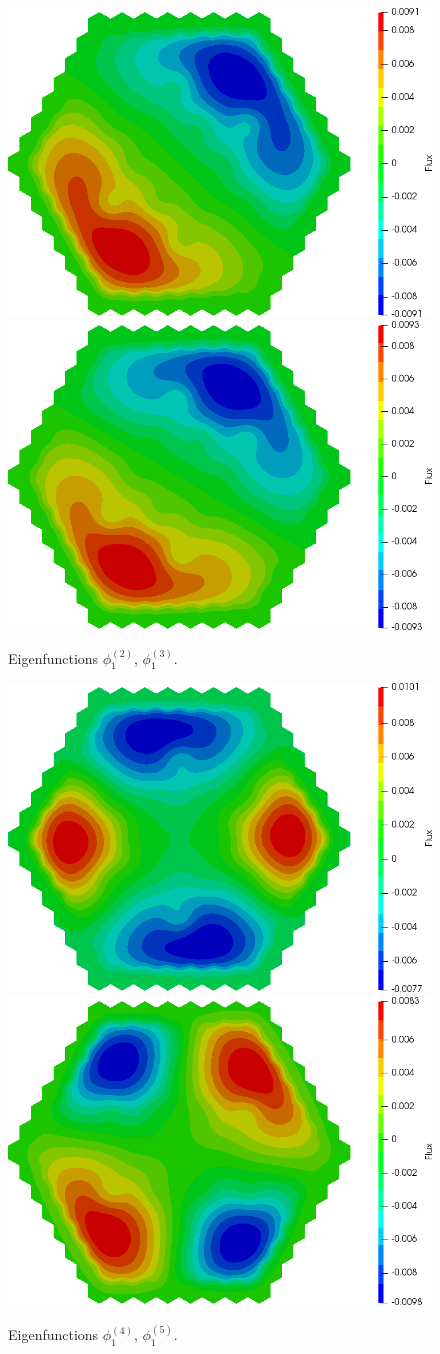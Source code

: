 \documentclass[authoryear]{elsarticle}
\begin{document}
\begin{figure}[H]
\begin{center}
	\includegraphics[width=0.49\linewidth]{iaea_with/alpha_delayed_sp3_u1_2.png}
	\includegraphics[width=0.49\linewidth]{iaea_with/alpha_delayed_sp3_u1_3.png}\\
	\caption{Eigenfunctions $\phi_1^{(2)}$, $\phi_1^{(3)}$.}
	\label{fig:iaea_with_fun_del_2}
\end{center}
\end{figure}
\begin{figure}[H]
\begin{center}
	\includegraphics[width=0.49\linewidth]{iaea_with/alpha_delayed_sp3_u1_4.png}
	\includegraphics[width=0.49\linewidth]{iaea_with/alpha_delayed_sp3_u1_5.png}\\
	\caption{Eigenfunctions $\phi_1^{(4)}$, $\phi_1^{(5)}$.}
	\label{fig:iaea_with_fun_del_3}
\end{center}
\end{figure}
\end{document}
